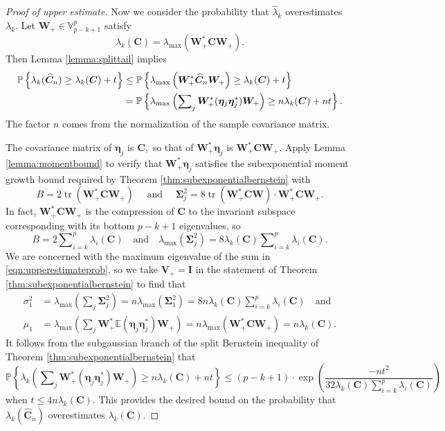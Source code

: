 \documentclass[11pt,letterpaper,twoside,reqno,nosumlimits]{amsart}
\renewcommand{\star}{*}
\newcommand{\mat}[1]{\ensuremath{\bm{#1}}} %
\renewcommand{\vec}[1]{\ensuremath{\bm{#1}}}
\newcommand{\E}{\ensuremath{\mathbb{E}}}
\newcommand{\Prob}[1]{\ensuremath{\mathbb{P}\left\{#1\right\}}}
\newcommand{\lambdamax}[1]{\ensuremath{\lambda_{\mathrm{max}}\left(#1\right)}}
\newcommand{\Isom}[2]{\ensuremath{\mathbb{V}_{#1}^{#2}}}
\DeclareMathOperator{\tr}{tr}
\theoremstyle{remark}
\numberwithin{equation}{section}
\numberwithin{thm}{section}
\numberwithin{prop}{section}
\numberwithin{defn}{section}
\numberwithin{remark}{section}
\begin{document}
\begin{proof}[Proof of upper estimate]
Now we consider the probability that $\hat{\lambda}_k$ overestimates $\lambda_k$. Let $\mat{W}_+ \in \Isom{p-k+1}{p}$ satisfy
\[
 \lambda_k(\mat{C}) = \lambdamax{\mat{W}_+^\star \mat{C} \mat{W}_+}.
\]
Then Lemma \ref{lemma:splittail} implies
\begin{align}
 \Prob{\lambda_k(\widehat{\mat{C}}_n) \geq \lambda_k(\mat{C}) + t} & \leq \Prob{\lambdamax{\mat{W}_+^\star \widehat{\mat{C}}_n \mat{W}_+} \geq \lambda_k(\mat{C}) + t} \notag \\
& = \Prob{\lambdamax{\sum\nolimits_j \mat{W}_+^\star (\vec{\eta}_j \vec{\eta}_j^\star) \mat{W}_+} \geq n \lambda_k(\mat{C}) + n t}.
\label{eqn:upperestimateprob}
\end{align}
The factor $n$ comes from the normalization of the sample covariance matrix.

The covariance matrix of $\vec{\eta}_j$ is $\mat{C},$ so that of $\mat{W}_+^\star \vec{\eta}_j$ is $\mat{W}_+^\star\mat{C}\mat{W}_+.$ Apply Lemma \ref{lemma:momentbound} to verify that $\mat{W}_+^\star \vec{\eta}_j$ satisfies the subexponential moment growth bound required by Theorem \ref{thm:subexponentialbernstein} with 
\[
 B = 2 \tr(\mat{W}_+^*\mat{C}\mat{W}_+) \quad\text{ and }\quad \mat{\Sigma}_j^2 = 8\tr(\mat{W}_+^*\mat{C}\mat{W})\cdot \mat{W}_+^*\mat{C}\mat{W}_+.
\]
In fact, $\mat{W}_+^*\mat{C}\mat{W}_+$ is the compression of $\mat{C}$ to the invariant subspace corresponding with its bottom $p-k+1$ eigenvalues, so 
\[
B = 2 \sum\nolimits_{i=k}^p \lambda_i(\mat{C}) \quad\text{and}\quad \lambdamax{\mat{\Sigma}_j^2} = 8 \lambda_k(\mat{C}) \sum\nolimits_{i=k}^p \lambda_i(\mat{C}).
\]
We are concerned with the maximum eigenvalue of the sum in \eqref{eqn:upperestimateprob}, so we take $\mat{V}_+ = \mathbf{I}$ in the statement of Theorem \ref{thm:subexponentialbernstein} to find that
\begin{align*}
 \sigma_1^2 & = \lambdamax{\sum\nolimits_j \mat{\Sigma}_j^2 } = n \lambdamax{\mat{\Sigma}_1^2} = 8 n \lambda_k(\mat{C}) \sum\nolimits_{i=k}^p \lambda_i(\mat{C}) \quad \text{and}
\\ \mu_1 & = \lambdamax{\sum_j \mat{W}_+^\star \E(\vec{\eta}_j\vec{\eta}_j^\star) \mat{W}_+ } = n\lambdamax{\mat{W}_+^\star \mat{C} \mat{W}_+} = n \lambda_k(\mat{C}).
\end{align*}
It follows from the subgaussian branch of the split Bernstein inequality of Theorem \ref{thm:subexponentialbernstein} that 
$$
\Prob{\lambda_k \left(\sum\nolimits_j \mat{W}_+^\star (\vec{\eta}_j \vec{\eta}_j^\star) \mat{W}_+ \right) \geq n \lambda_k(\mat{C}) + n t} \leq 
 (p-k+1) \cdot \exp\left( \displaystyle \frac{-nt^2}{32 \lambda_k(\mat{C}) \sum_{i=k}^p \lambda_i(\mat{C})} \right)
$$
when $t \leq 4 n \lambda_k(\mat{C}).$ This provides the desired bound on the probability that $\lambda_k(\widehat{\mat{C}}_n)$ overestimates $\lambda_k(\mat{C}).$
\end{proof}
\end{document}
